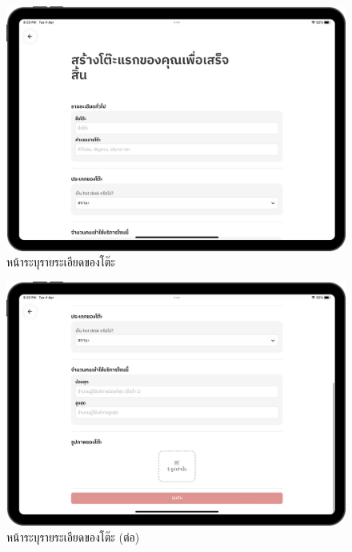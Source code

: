 \begin{figure}[ht]
    \begin{center}
    \includegraphics[width=5.5in]{./image/Flowider_desk_1.png}
    \end{center}
    \caption[Flowider desk 1]{หน้าระบุรายระเอียดของโต๊ะ}
    \label{fig:Flowider_desk_1}
\end{figure}
\begin{figure}[ht]
    \begin{center}
    \includegraphics[width=5.5in]{./image/Flowider_desk_2.png}
    \end{center}
    \caption[Flowider desk 2]{หน้าระบุรายระเอียดของโต๊ะ (ต่อ)}
    \label{fig:Flowider_desk_2}
\end{figure}
